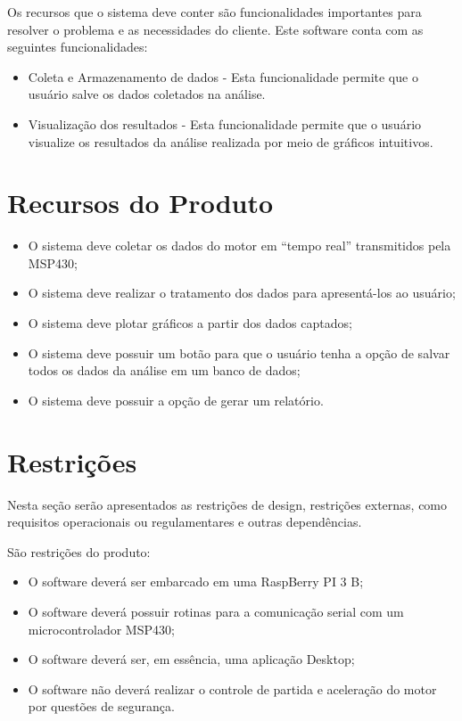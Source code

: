 \begin{anexosenv}
Os recursos que o sistema deve conter são funcionalidades importantes para resolver o problema e as necessidades do cliente. Este software conta com as seguintes funcionalidades:

\begin{itemize}
	\item Coleta e Armazenamento de dados - Esta funcionalidade permite que o usuário salve os dados coletados na análise.
	\item Visualização dos resultados - Esta funcionalidade permite que o usuário visualize os resultados da análise realizada por meio de gráficos intuitivos.
\end{itemize}

\section{Recursos do Produto}

\begin{itemize}
	\item O sistema deve coletar os dados do motor em “tempo real” transmitidos pela MSP430;
	\item O sistema deve realizar o tratamento dos dados para apresentá-los ao usuário;
	\item O sistema deve plotar gráficos a partir dos dados captados;
	\item O sistema deve possuir um botão para que o usuário tenha a opção de salvar todos os dados da análise em um banco de dados;
	\item O sistema deve possuir a opção de gerar um relatório.
\end{itemize}

\section{Restrições}

Nesta seção serão apresentados as restrições de design, restrições externas, como requisitos operacionais ou regulamentares e outras dependências.

São restrições do produto:

\begin{itemize}
	\item O software deverá ser embarcado em uma RaspBerry PI 3 B;
	\item O software deverá possuir rotinas para a comunicação serial com um microcontrolador MSP430;
	\item O software deverá ser, em essência, uma aplicação Desktop;
	\item O software não deverá realizar o controle de partida e aceleração do motor por questões de segurança.
\end{itemize}


\end{anexosenv}
